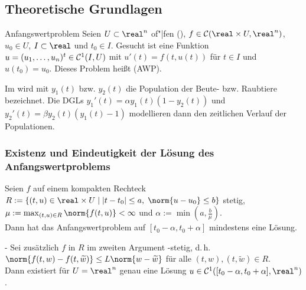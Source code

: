 \subsection{%
    Theoretische Grundlagen%
}

\begin{Def}{Anfangswertproblem}
    Seien $U \subset \real^n$ of"|fen (),
    $f \in \C(\real \times U, \real^n)$, $u_0 \in U$,
    $I \subset \real$ und $t_0 \in I$.
    Gesucht ist eine Funktion $u = (u_1, \dotsc, u_n)^t \in \mathcal{C}^1(I, U)$
    mit $u'(t) = f(t, u(t))$ für $t \in I$ und $u(t_0) = u_0$.
    Dieses Problem heißt  (AWP).
\end{Def}

\begin{Bsp}
    Im  wird mit $y_1(t)$ bzw. $y_2(t)$ die
    Population der Beute- bzw. Raubtiere bezeichnet.
    Die DGLs $y_1'(t) = \alpha y_1(t) (1 - y_2(t))$ und
    $y_2'(t) = \beta y_2(t) (y_1(t) - 1)$ modellieren dann den
    zeitlichen Verlauf der Populationen.
\end{Bsp}

\subsubsection{%
    Existenz und Eindeutigkeit der Lösung des Anfangswertproblems%
}

\begin{Satz}{}
    Seien $f$ auf einem kompakten Rechteck\\
    $R := \{(t, u) \in \real \times U \;|\;
    |t - t_0| \le a,\; \norm{u - u_0} \le b\}$ stetig,\\
    $\mu := \max_{(t, u) \in R} \norm{f(t, u)} < \infty$ und
    $\alpha := \min(a, \frac{b}{\mu})$.\\
    Dann hat das Anfangswertproblem auf $[t_0 - \alpha, t_0 + \alpha]$
    mindestens eine Lösung.
\end{Satz}

\begin{Satz}{-}
    Sei zusätzlich $f$ in $R$ im zweiten Argument -stetig,
    d.\,h.
    $\norm{f(t, w) - f(t, \widetilde{w})} \le L \norm{w - \widetilde{w}}$
    für alle $(t, w), (t, \widetilde{w}) \in R$.\\
    Dann existiert für $U = \real^n$ genau eine Lösung
    $u \in \C^1([t_0 - \alpha, t_0 + \alpha], \real^n)$.
\end{Satz}

